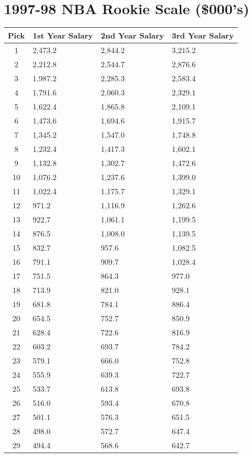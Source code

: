 \documentclass[
]{book}
\begin{document}
\newpage

\hypertarget{nba-rookie-scale-000s-2}{%
\section{1997-98 NBA Rookie Scale (\$000's)}\label{nba-rookie-scale-000s-2}}

\begin{longtable}[]{@{}clll@{}}
\toprule()
Pick & 1st Year Salary & 2nd Year Salary & 3rd Year Salary \\
\midrule()
\endhead
1 & 2,473.2 & 2,844.2 & 3,215.2 \\
2 & 2,212.8 & 2,544.7 & 2,876.6 \\
3 & 1,987.2 & 2,285.3 & 2,583.4 \\
4 & 1,791.6 & 2,060.3 & 2,329.1 \\
5 & 1,622.4 & 1,865.8 & 2,109.1 \\
6 & 1,473.6 & 1,694.6 & 1,915.7 \\
7 & 1,345.2 & 1,547.0 & 1,748.8 \\
8 & 1,232.4 & 1,417.3 & 1,602.1 \\
9 & 1,132.8 & 1,302.7 & 1,472.6 \\
10 & 1,076.2 & 1,237.6 & 1,399.0 \\
11 & 1,022.4 & 1,175.7 & 1,329.1 \\
12 & 971.2 & 1,116.9 & 1,262.6 \\
13 & 922.7 & 1,061.1 & 1,199.5 \\
14 & 876.5 & 1,008.0 & 1,139.5 \\
15 & 832.7 & 957.6 & 1,082.5 \\
16 & 791.1 & 909.7 & 1,028.4 \\
17 & 751.5 & 864.3 & 977.0 \\
18 & 713.9 & 821.0 & 928.1 \\
19 & 681.8 & 784.1 & 886.4 \\
20 & 654.5 & 752.7 & 850.9 \\
21 & 628.4 & 722.6 & 816.9 \\
22 & 603.2 & 693.7 & 784.2 \\
23 & 579.1 & 666.0 & 752.8 \\
24 & 555.9 & 639.3 & 722.7 \\
25 & 533.7 & 613.8 & 693.8 \\
26 & 516.0 & 593.4 & 670.8 \\
27 & 501.1 & 576.3 & 651.5 \\
28 & 498.0 & 572.7 & 647.4 \\
29 & 494.4 & 568.6 & 642.7 \\
\bottomrule()
\end{longtable}
\end{document}
